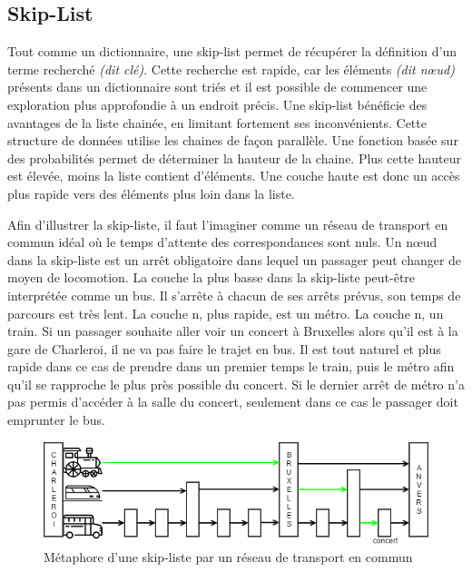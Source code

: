 \documentclass[hidelinks,a4paper, 12pt]{article}
\begin{document}
	\newpage
	\subsection{Skip-List}
	
	
	Tout comme un dictionnaire, une skip-list permet de récupérer la définition d'un terme recherché \textit{(dit clé)}. Cette recherche est rapide, car les éléments \textit{(dit nœud)} présents dans un dictionnaire sont triés et il est possible de commencer une exploration plus approfondie à un endroit précis.
	Une skip-list bénéficie des avantages de la liste chainée, en limitant fortement ses inconvénients. Cette structure de données utilise les chaines de façon parallèle. Une fonction basée sur des probabilités permet de déterminer la hauteur de la chaine. Plus cette hauteur est élevée, moins la liste contient d'éléments. Une couche haute est donc un accès plus rapide vers des éléments plus loin dans la liste.
	
	
	
	Afin d'illustrer la skip-liste, il faut l'imaginer comme un réseau de transport en commun idéal où le temps d'attente des correspondances sont nuls. Un nœud dans la skip-liste est un arrêt obligatoire dans lequel un passager peut changer de moyen de locomotion. La couche la plus basse dans la skip-liste peut-être interprétée comme un bus. Il s'arrête à chacun de ses arrêts prévus, son temps de parcours est très lent. La couche n, plus rapide, est un métro. La couche n, un train. Si un passager souhaite aller voir un concert à Bruxelles alors qu'il est à la gare de Charleroi, il ne va pas faire le trajet en bus. Il est tout naturel et plus rapide dans ce cas de prendre dans un premier temps le train, puis le métro afin qu'il se rapproche le plus près possible du concert. Si le dernier arrêt de métro n'a pas permis d'accéder à la salle du concert, seulement dans ce cas le passager doit emprunter le bus.
	
	\begin{figure}[h!]
		\includegraphics[width=\textwidth]{img/metaphore}
		\caption{Métaphore d'une skip-liste par un réseau de transport en commun}
		\label{skip-meta}
	\end{figure}
	
\end{document}
